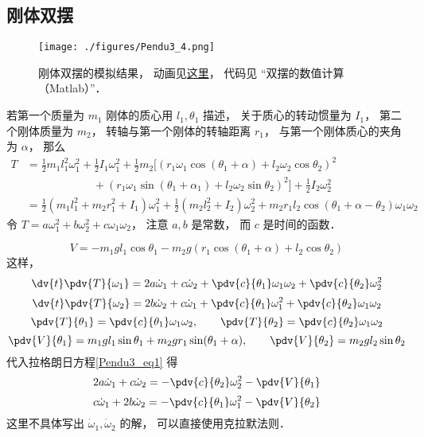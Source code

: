 \subsection{刚体双摆}

\begin{figure}[ht]
\centering
\texttt{[image: ./figures/Pendu3\_4.png]}
\caption{刚体双摆的模拟结果， 动画见\href{https://wuli.wiki/apps/RigDbPend.html}{这里}， 代码见 “双摆的数值计算（Matlab）”．} \label{Pendu3_fig4}
\end{figure}
若第一个质量为 $m_1$ 刚体的质心用 $l_1,\theta_1$ 描述， 关于质心的转动惯量为 $I_1$， 第二个刚体质量为 $m_2$， 转轴与第一个刚体的转轴距离 $r_1$， 与第一个刚体质心的夹角为 $\alpha$， 那么
\begin{equation}
\begin{aligned}
T &= \frac{1}{2}m_1 l_1^2 \omega_1^2 + \frac{1}{2}I_1 \omega_1^2
 + \frac{1}{2}m_2[(r_1\omega_1\cos(\theta_1 + \alpha) + l_2\omega_2\cos\theta_2)^2\\
&\qquad \qquad \qquad+ (r_1\omega_1\sin(\theta_1+\alpha_1) + l_2\omega_2\sin\theta_2)^2] + \frac{1}{2}I_2\omega_2^2\\
&= \frac{1}{2}(m_1l_1^2 + m_2r_1^2 + I_1)\omega_1^2 + \frac{1}{2}(m_2l_2^2 + I_2)\omega_2^2 + m_2r_1l_2\cos(\theta_1+\alpha-\theta_2)\omega_1\omega_2
\end{aligned}
\end{equation}
令 $T = a\omega_1^2 + b\omega_2^2 + c\omega_1\omega_2$， 注意 $a,b$ 是常数， 而 $c$ 是时间的函数．

\begin{equation}  
V = -m_1 g l_1 \cos \theta_1 - m_2 g (r_1\cos(\theta_1 + \alpha) + l_2 \cos \theta_2)
\end{equation}
这样，
\begin{equation}
\dv{t}\pdv{T}{\omega_1} = 2a\dot\omega_1 + c\dot\omega_2 + \pdv{c}{\theta_1}\omega_1\omega_2 + \pdv{c}{\theta_2}\omega_2^2
\end{equation}
\begin{equation}
\dv{t}\pdv{T}{\omega_2} = 2b\dot\omega_2 + c\dot\omega_1 + \pdv{c}{\theta_1}\omega_1^2 + \pdv{c}{\theta_2}\omega_1\omega_2
\end{equation}
\begin{equation}
\pdv{T}{\theta_1} = \pdv{c}{\theta_1}\omega_1\omega_2, \qquad
\pdv{T}{\theta_2} = \pdv{c}{\theta_2}\omega_1\omega_2
\end{equation}
\begin{equation}
\pdv{V}{\theta_1} = m_1gl_1\sin\theta_1 + m_2gr_1\sin(\theta_1+\alpha), \qquad
\pdv{V}{\theta_2} = m_2gl_2\sin\theta_2
\end{equation}
代入拉格朗日方程\autoref{Pendu3_eq1} 得
\begin{equation}
2a\dot\omega_1 + c\dot\omega_2 = -\pdv{c}{\theta_2}\omega_2^2 - \pdv{V}{\theta_1}
\end{equation}
\begin{equation}
c\dot\omega_1 + 2b\dot\omega_2 = -\pdv{c}{\theta_1}\omega_1^2 - \pdv{V}{\theta_2}
\end{equation}
这里不具体写出 $\dot\omega_1, \dot\omega_2$ 的解， 可以直接使用克拉默法则．

